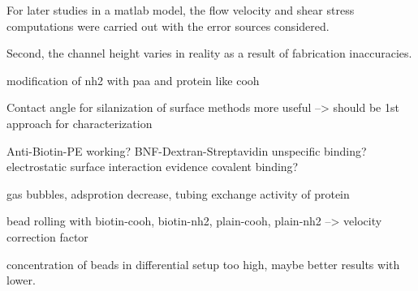 For later studies in a matlab model, the flow velocity and shear stress computations were carried out with the error sources considered. 




Second, the channel height varies in reality as a result of fabrication inaccuracies. 

modification of nh2 with paa and protein like cooh

Contact angle for silanization of surface methods more useful --> should be 1st approach for characterization

Anti-Biotin-PE working?
BNF-Dextran-Streptavidin unspecific binding?
electrostatic surface interaction
evidence covalent binding?

gas bubbles, adsprotion decrease, tubing exchange
activity of protein

bead rolling with biotin-cooh, biotin-nh2, plain-cooh, plain-nh2 --> velocity correction factor

concentration of beads in differential setup too high, maybe better results with lower.